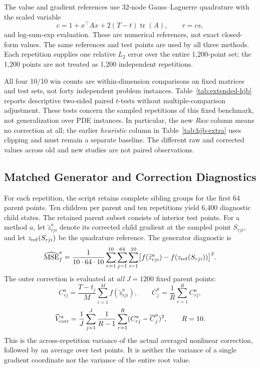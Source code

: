 The value and gradient references use 32-node Gauss--Laguerre quadrature with the scaled variable
\[
 c=1+x^\top A x+2(T-t)\operatorname{tr}(A),\qquad r=cs,
\]
and log-sum-exp evaluation. These are numerical references, not exact closed-form values. The same references and test points are used by all three methods. Each repetition supplies one relative $L_2$ error over the entire 1,200-point set; the 1,200 points are not treated as 1,200 independent repetitions.



All four 10/10 win counts are within-dimension comparisons on fixed matrices and test sets, not forty independent problem instances. Table~\ref{tab:extended-hjb} reports descriptive two-sided paired $t$-tests without multiple-comparison adjustment. These tests concern the sampled repetitions of this fixed benchmark, not generalization over PDE instances. In particular, the new \emph{Raw} column means no correction at all; the earlier \emph{heuristic} column in Table~\ref{tab:hjb-extra} uses clipping and must remain a separate baseline. The different raw and corrected values across old and new studies are not paired observations.

\subsection{Matched Generator and Correction Diagnostics}
\label{app:extended-diag}
For each repetition, the script retains complete sibling groups for the first 64 parent points. Ten children per parent and ten repetitions yield 6,400 diagnostic child states. The retained parent subset consists of interior test points. For a method $a$, let $\widetilde z_{rji}^{a}$ denote its corrected child gradient at the sampled point $S_{rji}$, and let $z_{\rm ref}(S_{rji})$ be the quadrature reference. The generator diagnostic is
\[
 \widehat{\operatorname{MSE}}_f^{a}
 =\frac1{10\cdot64\cdot10}
 \sum_{r=1}^{10}\sum_{j=1}^{64}\sum_{i=1}^{10}
 \bigl[f(\widetilde z_{rji}^{a})-f(z_{\rm ref}(S_{rji}))\bigr]^2.
\]
The outer correction is evaluated at \emph{all} $J=1200$ fixed parent points:
\[
 C_{rj}^{a}=\frac{T-t_j}{M}\sum_{i=1}^{M}f(\widetilde z_{rji}^{a}),\qquad
 \overline C_j^{a}=\frac1R\sum_{r=1}^{R}C_{rj}^{a},
\]
\[
 \widehat V_{\rm corr}^{a}
 =\frac1J\sum_{j=1}^J\frac1{R-1}
 \sum_{r=1}^R(C_{rj}^{a}-\overline C_j^{a})^2,
 \qquad R=10.
\]
This is the across-repetition variance of the actual averaged nonlinear correction, followed by an average over test points. It is neither the variance of a single gradient coordinate nor the variance of the entire root value.

